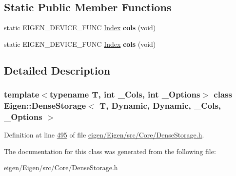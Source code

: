 \subsection*{Static Public Member Functions}
\begin{DoxyCompactItemize}
\item 
\mbox{\label{class_eigen_1_1_dense_storage_3_01_t_00_01_dynamic_00_01_dynamic_00_01___cols_00_01___options_01_4_a274b437b4e66b517494cc88fa08364f5}} 
static E\+I\+G\+E\+N\+\_\+\+D\+E\+V\+I\+C\+E\+\_\+\+F\+U\+NC \hyperlink{namespace_eigen_a62e77e0933482dafde8fe197d9a2cfde}{Index} {\bfseries cols} (void)
\item 
\mbox{\label{class_eigen_1_1_dense_storage_3_01_t_00_01_dynamic_00_01_dynamic_00_01___cols_00_01___options_01_4_a274b437b4e66b517494cc88fa08364f5}} 
static E\+I\+G\+E\+N\+\_\+\+D\+E\+V\+I\+C\+E\+\_\+\+F\+U\+NC \hyperlink{namespace_eigen_a62e77e0933482dafde8fe197d9a2cfde}{Index} {\bfseries cols} (void)
\end{DoxyCompactItemize}


\subsection{Detailed Description}
\subsubsection*{template$<$typename T, int \+\_\+\+Cols, int \+\_\+\+Options$>$\newline
class Eigen\+::\+Dense\+Storage$<$ T, Dynamic, Dynamic, \+\_\+\+Cols, \+\_\+\+Options $>$}



Definition at line \hyperlink{eigen_2_eigen_2src_2_core_2_dense_storage_8h_source_l00495}{495} of file \hyperlink{eigen_2_eigen_2src_2_core_2_dense_storage_8h_source}{eigen/\+Eigen/src/\+Core/\+Dense\+Storage.\+h}.



The documentation for this class was generated from the following file\+:\begin{DoxyCompactItemize}
\item 
eigen/\+Eigen/src/\+Core/\+Dense\+Storage.\+h\end{DoxyCompactItemize}
